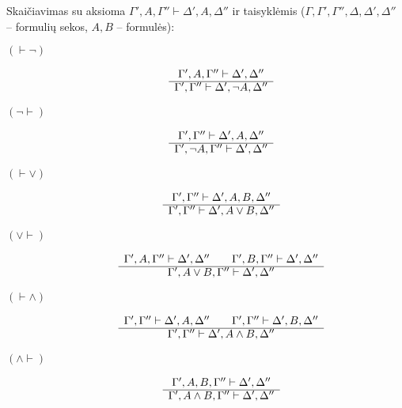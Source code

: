 \begin{defn}
  Skaičiavimas su aksioma $\Gamma',A,\Gamma'' \vdash \Delta',A,\Delta''$
  ir taisyklėmis ($\Gamma,\Gamma',\Gamma'',\Delta,\Delta',\Delta''$ – 
  formulių sekos, $A,B$ – formulės):
  \begin{description}
    \item[$(\vdash \neg)$] 
      \[
      \begin{array}{c}
        \Gamma',A,\Gamma'' \vdash \Delta',\Delta'' \\
        \cline{1-1}
        \Gamma',\Gamma'' \vdash \Delta',\neg A,\Delta''
      \end{array}
      \]
    \item[$(\neg \vdash)$] 
      \[
      \begin{array}{c}
        \Gamma',\Gamma'' \vdash \Delta',A,\Delta'' \\
        \cline{1-1}
        \Gamma',\neg A,\Gamma'' \vdash \Delta',\Delta''
      \end{array}
      \]
    \item[$(\vdash \lor)$] 
      \[
      \begin{array}{c}
        \Gamma',\Gamma'' \vdash \Delta',A,B,\Delta'' \\
        \cline{1-1}
        \Gamma',\Gamma'' \vdash \Delta',A \lor B,\Delta''
      \end{array}
      \]
    \item[$(\lor \vdash)$] 
      \[
      \begin{array}{c}
        \Gamma',A,\Gamma'' \vdash \Delta',\Delta'' \qquad %
        \Gamma',B,\Gamma'' \vdash \Delta',\Delta'' \\
        \cline{1-1}
        \Gamma',A \lor B,\Gamma'' \vdash \Delta',\Delta''
      \end{array}
      \]
    \item[$(\vdash \land)$] 
      \[
      \begin{array}{c}
        \Gamma',\Gamma'' \vdash \Delta',A,\Delta'' \qquad %
        \Gamma',\Gamma'' \vdash \Delta',B,\Delta'' \\
        \cline{1-1}
        \Gamma',\Gamma'' \vdash \Delta',A \land B, \Delta''
      \end{array}
      \]
    \item[$(\land \vdash)$] 
      \[
      \begin{array}{c}
        \Gamma',A,B,\Gamma'' \vdash \Delta',\Delta'' \\
        \cline{1-1}
        \Gamma',A \land B,\Gamma'' \vdash \Delta',\Delta''

\end{array}\]
\end{description}
\end{defn}
